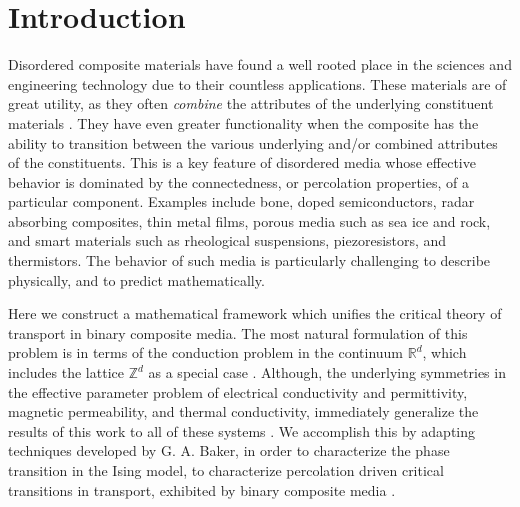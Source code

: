\documentclass[english,12pt,jmp,graphicx]{revtex4-1}
\begin{document}

\maketitle %

%
\section{Introduction}\label{sec:Introduction}
%
Disordered composite materials have found a well rooted place in the
sciences and engineering technology due to their countless
applications. These materials are of great utility, as they often
\emph{combine} the attributes of the underlying constituent materials
\cite{MILTON:2002:TC}. They have even greater functionality when the
composite has the ability to transition between the various underlying
and/or combined attributes of the constituents. This is a key feature
of disordered media whose effective behavior is dominated by the
connectedness, or percolation properties, of a particular
component. Examples include bone, doped semiconductors, radar
absorbing composites, thin metal films, porous media such as sea ice
and rock, and smart materials such as rheological suspensions,
piezoresistors, and thermistors. The behavior of such media is
particularly  challenging to describe physically, and to predict
mathematically. 

Here we construct a mathematical framework which unifies the critical
theory of transport in binary composite media. The most natural
formulation of this problem is in terms of the conduction problem in
the continuum $\mathbb{R}^d$, which includes the lattice
$\mathbb{Z}^d$ as a special case
\cite{Golden:JMP-5627,Golden:CMP-473}. Although, the underlying
symmetries in the effective parameter problem of electrical
conductivity and permittivity, magnetic permeability, and thermal
conductivity, immediately generalize the results of this work to
all of these systems \cite{MILTON:2002:TC}. We accomplish this by
adapting techniques developed by G. A. Baker, in order to characterize
the phase transition in the Ising model, to characterize percolation
driven critical transitions in transport, exhibited by binary
composite media \cite{Baker-1990}.  
\end{document}

